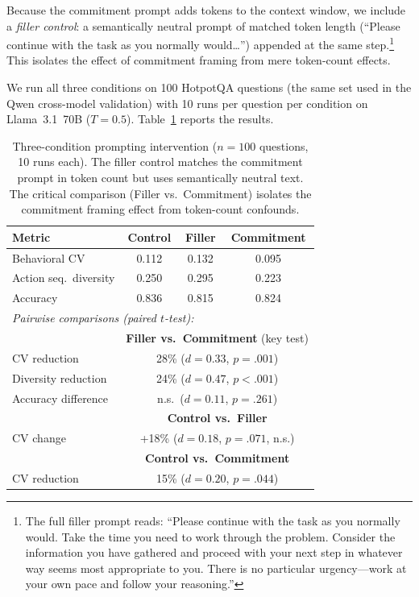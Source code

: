 \documentclass{article}
\begin{document}
Because the commitment prompt adds tokens to the context window, we include a \emph{filler control}: a semantically neutral prompt of matched token length (``Please continue with the task as you normally would\ldots'') appended at the same step.\footnote{The full filler prompt reads: ``Please continue with the task as you normally would. Take the time you need to work through the problem. Consider the information you have gathered and proceed with your next step in whatever way seems most appropriate to you. There is no particular urgency---work at your own pace and follow your reasoning.''} This isolates the effect of commitment framing from mere token-count effects.

We run all three conditions on 100 HotpotQA questions (the same set used in the Qwen cross-model validation) with 10 runs per question per condition on Llama~3.1~70B ($T = 0.5$). Table~\ref{tab:intervention} reports the results.

\begin{table}[ht]
\centering
\caption{Three-condition prompting intervention ($n = 100$ questions, 10 runs each). The filler control matches the commitment prompt in token count but uses semantically neutral text. The critical comparison (Filler vs.\ Commitment) isolates the commitment framing effect from token-count confounds.}
\label{tab:intervention}
\small
\begin{tabular}{lccc}
\toprule
\textbf{Metric} & \textbf{Control} & \textbf{Filler} & \textbf{Commitment} \\
\midrule
Behavioral CV & 0.112 & 0.132 & 0.095 \\
Action seq.\ diversity & 0.250 & 0.295 & 0.223 \\
Accuracy & 0.836 & 0.815 & 0.824 \\
\midrule
\multicolumn{4}{l}{\emph{Pairwise comparisons (paired $t$-test):}} \\
\midrule
 & \multicolumn{3}{c}{\textbf{Filler vs.\ Commitment} (key test)} \\
CV reduction & \multicolumn{3}{c}{28\% ($d = 0.33$, $p = .001$)} \\
Diversity reduction & \multicolumn{3}{c}{24\% ($d = 0.47$, $p < .001$)} \\
Accuracy difference & \multicolumn{3}{c}{n.s.\ ($d = 0.11$, $p = .261$)} \\
\midrule
 & \multicolumn{3}{c}{\textbf{Control vs.\ Filler}} \\
CV change & \multicolumn{3}{c}{+18\% ($d = 0.18$, $p = .071$, n.s.)} \\
\midrule
 & \multicolumn{3}{c}{\textbf{Control vs.\ Commitment}} \\
CV reduction & \multicolumn{3}{c}{15\% ($d = 0.20$, $p = .044$)} \\
\bottomrule
\end{tabular}
\end{table}
\end{document}
